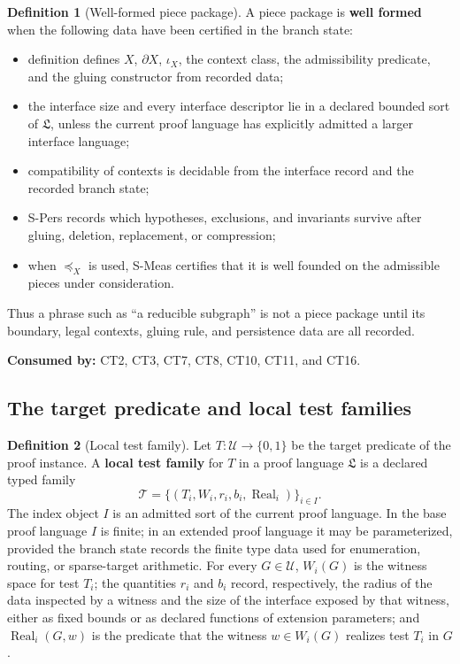 \documentclass[
  11pt,
]{article}
\providecommand{\tightlist}{%
  \setlength{\itemsep}{0pt}\setlength{\parskip}{0pt}}
\theoremstyle{definition}
\newtheorem{definition}{Definition}[section]
\begin{document}
\begin{definition}[Well-formed piece package]\label{def:well-formed-piece-package}
A piece package is \textbf{well formed} when the following data have
been certified in the branch state:

\begin{itemize}
\tightlist
\item
  definition defines \(X\), \(\partial X\), \(\iota_X\), the context class,
  the admissibility predicate, and the gluing constructor from recorded
  data;
\item
  the interface size and every interface descriptor lie in a declared
  bounded sort of \(\mathfrak L\), unless the current proof language has
  explicitly admitted a larger interface language;
\item
  compatibility of contexts is decidable from the interface record and
  the recorded branch state;
\item
  S-Pers records which hypotheses, exclusions, and invariants survive
  after gluing, deletion, replacement, or compression;
\item
  when \(\preceq_X\) is used, S-Meas certifies that it is well founded
  on the admissible pieces under consideration.
\end{itemize}

Thus a phrase such as ``a reducible subgraph'' is not a piece package
until its boundary, legal contexts, gluing rule, and persistence data
are all recorded.
\end{definition}

\noindent\textbf{Consumed by:} CT2, CT3, CT7, CT8, CT10, CT11, and CT16.

\subsection{The target predicate and local test families}\label{data-target-tests}
\begin{definition}[Local test family]\label{def:local-test-family}
Let \(T:\mathcal U\to\{0,1\}\) be the target predicate of the proof
instance.  A \textbf{local test family} for \(T\) in a proof language
\(\mathfrak L\) is a declared typed family
\[
\mathcal T=\{(T_i,W_i,r_i,b_i,\operatorname{Real}_i)\}_{i\in I}.
\]
The index object \(I\) is an admitted sort of the current proof
language.  In the base proof language \(I\) is finite; in an extended
proof language it may be parameterized,
provided the branch state records the finite type data used for
enumeration, routing, or sparse-target arithmetic.  For every
\(G\in\mathcal U\), \(W_i(G)\) is the witness space for test \(T_i\);
the quantities \(r_i\) and \(b_i\) record, respectively, the radius of
the data inspected by a witness and the size of the interface exposed by
that witness, either as fixed bounds or as declared functions of
extension parameters; and
\(\operatorname{Real}_i(G,w)\) is the predicate that the witness
\(w\in W_i(G)\) realizes test \(T_i\) in \(G\).
\end{definition}
\end{document}
